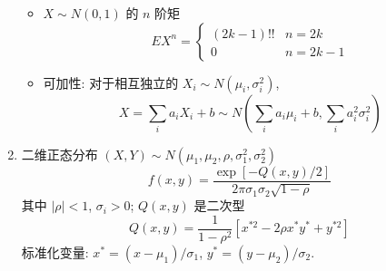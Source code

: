 \documentclass[11pt,a4paper,twocolumn]{article} %
\numberwithin{equation}{section} %
\begin{document}
\begin{enumerate}
\begin{itemize}
		\item $X\sim N(0,1)$ 的 $n$ 阶矩
		\begin{equation}
			EX^n = \begin{cases}
				(2k-1)!! & n=2k \\
				0 & n=2k-1
			\end{cases}
		\end{equation}
		\item 可加性: 对于相互独立的 $X_i\sim N(\mu_i, \sigma_i^2)$, 
		\begin{equation}
			X = \sum_i a_i X_i + b \sim 
			N(\sum_i a_i\mu_i + b, \sum_i a_i^2\sigma_i^2)
		\end{equation}
	\end{itemize}
	\item 二维正态分布 $(X, Y)\sim N(\mu_1, \mu_2, \rho, \sigma_1^2, \sigma_2^2)$
	\begin{equation}
		f(x, y) = \frac{\exp\left[-Q(x, y)/2\right]}{2\pi\sigma_1\sigma_2\sqrt{1-\rho}}
	\end{equation}
	其中 $|\rho|<1$, $\sigma_i > 0$; $Q(x, y)$ 是二次型
	\begin{equation}
		Q(x, y) = \frac{1}{1-\rho^2}\left[x^{*2}-2\rho x^*y^* + y^{*2}\right]
	\end{equation}
	标准化变量: $x^* = (x-\mu_1)/\sigma_1$, 
	$y^* = (y-\mu_2)/\sigma_2$. 


\end{enumerate}
\end{document}
